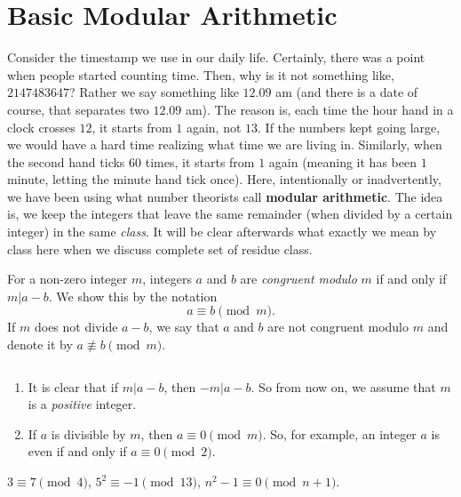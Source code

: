 \documentclass{subfile}
\begin{document}
	\section{Basic Modular Arithmetic}
	Consider the timestamp we use in our daily life. Certainly, there was a point when people started counting time. Then, why is it not something like, $2147483647$? Rather we say something like $12.09$ am (and there is a date of course, that separates two $12.09$ am). The reason is, each time the hour hand in a clock crosses $12$, it starts from $1$ again, not $13$. If the numbers kept going large, we would have a hard time realizing what time we are living in. Similarly, when the second hand ticks $60$ times, it starts from $1$ again (meaning it has been $1$ minute, letting the minute hand tick once). Here, intentionally or inadvertently, we have been using what number theorists call \textbf{modular arithmetic}. The idea is, we keep the integers that leave the same remainder (when divided by a certain integer) in the same \textit{class}. It will be clear afterwards what exactly we mean by class here when we discuss complete set of residue class\watermark.
	\begin{definition}
		For a non-zero integer $m$, integers $a$ and $b$ are \textit{congruent modulo} $m$ if and only if $m|a-b$. We show this by the notation 
		\[a \equiv b \pmod m.\] If $m$ does not divide $a-b$, we say that $a$ and $b$ are not congruent modulo $m$ and denote it by $a \not \equiv b \pmod m$.
	\end{definition}
	
	\begin{note}
		$ $
		\begin{enumerate}
			\item It is clear that if $m|a-b$, then $-m|a-b$. So from now on, we assume that $m$ is a \textit{positive} integer.
			\item If $a$ is divisible by $m$, then $a \equiv 0 \pmod m$. So, for example, an integer $a$ is even if and only if $a \equiv 0 \pmod 2$.
		\end{enumerate}
	\end{note}

	
	\begin{example}
		$3 \equiv 7 \pmod 4$,	$5^2 \equiv -1 \pmod {13}$, $n^2-1 \equiv 0 \pmod {n+1}$.
	\end{example}
	
\end{document}
